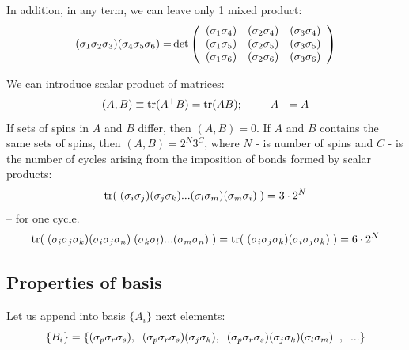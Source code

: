 \documentclass[a4paper]{jpconf}
\renewcommand\[{\begin{equation}}
\renewcommand\]{\end{equation}}
\begin{document}
In addition, in any term, we can leave only 1 mixed product:
\[{\rm{(}}{{\bf{\sigma }}_1}{{\bf{\sigma }}_2}{{\bf{\sigma }}_3}{\rm{)(}}{{\bf{\sigma }}_4}{{\bf{\sigma }}_5}{{\bf{\sigma }}_6}{\rm{) = }}\det \left( {\begin{array}{*{20}{c}}
	{{\rm{(}}{{\bf{\sigma }}_1}{{\bf{\sigma }}_4}{\rm{)}}}&{{\rm{(}}{{\bf{\sigma }}_2}{{\bf{\sigma }}_4}{\rm{)}}}&{{\rm{(}}{{\bf{\sigma }}_3}{{\bf{\sigma }}_4}{\rm{)}}}\\
	{{\rm{(}}{{\bf{\sigma }}_1}{{\bf{\sigma }}_5}{\rm{)}}}&{{\rm{(}}{{\bf{\sigma }}_2}{{\bf{\sigma }}_5}{\rm{)}}}&{{\rm{(}}{{\bf{\sigma }}_3}{{\bf{\sigma }}_5}{\rm{)}}}\\
	{{\rm{(}}{{\bf{\sigma }}_1}{{\bf{\sigma }}_6}{\rm{)}}}&{{\rm{(}}{{\bf{\sigma }}_2}{{\bf{\sigma }}_6}{\rm{)}}}&{{\rm{(}}{{\bf{\sigma }}_3}{{\bf{\sigma }}_6}{\rm{)}}}
	\end{array}} \right)
\label{mixeddet}
\]

We can introduce scalar product of matrices:
\[(A,B) \equiv \mathop{\rm{tr}}(A^+ B) = \mathop{\rm{tr}}(AB);\qquad {A^ + } = A\]
If sets of spins in $A$ and $B$ differ, then $(A,B) = 0$.
If $A$ and $B$ contains the same sets of spins, then $\left( {A,B} \right) = {2^N}{3^C}$,
where $N$ - is number of spins and $C$ - is the number of cycles arising from the imposition of bonds formed by scalar products:
\[{\rm{tr}}(\;({{\bf{\sigma }}_i}{{\bf{\sigma }}_j})({{\bf{\sigma }}_j}{{\bf{\sigma }}_k})...({{\bf{\sigma }}_l}{{\bf{\sigma }}_m})({{\bf{\sigma }}_m}{{\bf{\sigma }}_i})\;) = 3 \cdot {2^N}\]
-- for one cycle.
\[
{\rm{tr}}(\;({{\bf{\sigma }}_i}{{\bf{\sigma }}_j}{{\bf{\sigma }}_k})({{\bf{\sigma }}_i}{{\bf{\sigma }}_j}{{\bf{\sigma }}_n})\;({{\bf{\sigma }}_k}{{\bf{\sigma }}_l})...({{\bf{\sigma }}_m}{{\bf{\sigma }}_n})\;) = 
{\rm{tr}}(\;({{\bf{\sigma }}_i}{{\bf{\sigma }}_j}{{\bf{\sigma }}_k})({{\bf{\sigma }}_i}{{\bf{\sigma }}_j}{{\bf{\sigma }}_k})\;) = 6 \cdot {2^N}
\]

\subsection{Properties of basis}
Let us append into basis $\{A_i\}$ next elements:
$$
\{ B_i \}  = \{ ({\bf \sigma}_p{\bf\sigma}_r{\bf\sigma}_s),\;\;
({\bf \sigma}_p{\bf\sigma}_r{\bf\sigma}_s)({\bf \sigma}_j{\bf\sigma}_k), \;\;
({\bf \sigma}_p{\bf\sigma}_r{\bf\sigma}_s)({\bf \sigma}_j{\bf\sigma}_k)({\bf \sigma}_l{\bf\sigma}_m)\;\;,\;\;...\} 
$$
\end{document}
